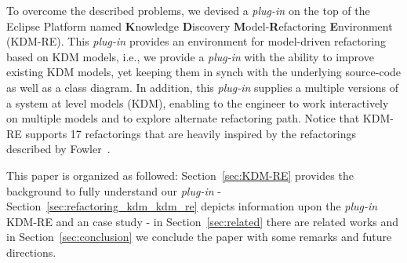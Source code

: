 To overcome the described problems, we devised a \textit{plug-in} on the top of the Eclipse Platform named  \textbf{K}nowledge \textbf{D}iscovery \textbf{M}odel-\textbf{R}efactoring \textbf{E}nvironment (KDM-RE). 
This \textit{plug-in} provides an environment for model-driven refactoring based on KDM models, i.e., we provide a \textit{plug-in} with the ability to improve existing KDM models, yet keeping them in synch with the underlying source-code as well as a class diagram. 
In addition, this \textit{plug-in} supplies a multiple versions of a system at level models (KDM), enabling to the engineer  to work interactively on multiple models and to explore alternate refactoring path. %
Notice that KDM-RE supports 17 refactorings that are heavily inspired by the refactorings described by Fowler~\cite{refactImpro}. 

This paper is organized as followed: Section~\ref{sec:KDM-RE} provides the background to fully understand our \textit{plug-in} - Section~\ref{sec:refactoring_kdm_kdm_re} depicts information upon the \textit{plug-in} KDM-RE and an case study - in Section~\ref{sec:related} there are related works and in Section~\ref{sec:conclusion} we conclude the paper with some remarks and future directions.







